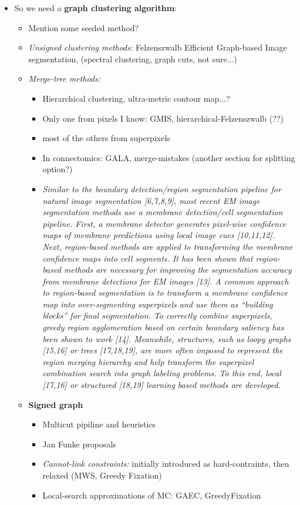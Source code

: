\documentclass[10pt,twocolumn,letterpaper]{article}
\newcommand\TODO[1]{{\color{red}{TODO: #1}}}
\newcommand\SOURCE[1]{{\color{green}{(from: #1)}}}
\begin{document}
\begin{itemize}
\item So we need a \textbf{graph clustering algorithm}:
\begin{itemize}
\item Mention some seeded method?
\item \textit{Unsigned clustering methods:} Felzenszwalb Efficient Graph-based Image segmentation, (spectral clustering, graph cuts, not sure...)  \TODO{Here I need some input about recent stuff}
\item \textit{Merge-tree methods:} 
\begin{itemize}
\item Hierarchical clustering, ultra-metric contour map...? \TODO{This needs more research}
\item Only one from pixels I know: GMIS, hierarchical-Felzenszwalb (??) 
\item most of the others from superpixels
\item In connectomics: GALA, merge-mistakes (another section for splitting option?)
\item \textit{Similar to the boundary detection/region segmentation pipeline for natural image segmentation [6,7,8,9], most recent EM image segmentation methods use a membrane detection/cell segmentation pipeline. First, a membrane detector generates pixel-wise conﬁdence maps of membrane predictions using local image cues [10,11,12]. Next, region-based methods are applied to transforming the membrane conﬁdence maps into cell segments. It has been shown that region-based methods are necessary for improving the segmentation accuracy from membrane detections for EM images [13]. A common approach to region-based segmentation is to transform a membrane conﬁdence map into over-segmenting superpixels and use them as “building blocks” for ﬁnal segmentation. To correctly combine superpixels, greedy region agglomeration based on certain boundary saliency has been shown to work [14]. Meanwhile, structures, such as loopy graphs [15,16] or trees [17,18,19], are more often imposed to represent the region merging hierarchy and help transform the superpixel combination search into graph labeling problems. To this end, local [17,16] or structured [18,19] learning based methods are developed.} \SOURCE{SSHMT} \SOURCE{Jan Funke Multicut proposals}
\end{itemize}
\item \textbf{Signed graph}
\begin{itemize}
\item Multicut pipiline and heuristics
\item Jan Funke proposals
\item \textit{Cannot-link constraints:} initially introduced as hard-contraints, then relaxed (MWS, Greedy Fixation)
\item Local-search approximations of MC: GAEC, GreedyFixation
\end{itemize}
\end{itemize}

\end{itemize}
\end{document}
